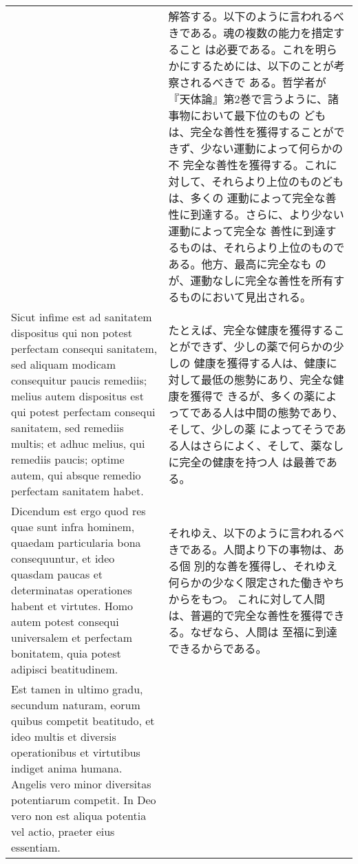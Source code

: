 \documentclass[paper=a4paper,fontsize=10pt,jafontsize=9pt,titlepage]{jlreq}
\begin{document}
\begin{longtable}{p{21em}p{21em}}
 &

解答する。以下のように言われるべきである。魂の複数の能力を措定すること
は必要である。これを明らかにするためには、以下のことが考察されるべきで
ある。哲学者が『天体論』第2巻で言うように、諸事物において最下位のもの
どもは、完全な善性を獲得することができず、少ない運動によって何らかの不
完全な善性を獲得する。これに対して、それらより上位のものどもは、多くの
運動によって完全な善性に到達する。さらに、より少ない運動によって完全な
善性に到達するものは、それらより上位のものである。他方、最高に完全なも
のが、運動なしに完全な善性を所有するものにおいて見出される。

\\


 Sicut infime est ad sanitatem dispositus qui non potest
 perfectam consequi sanitatem, sed aliquam modicam consequitur paucis
 remediis; melius autem dispositus est qui potest perfectam consequi
 sanitatem, sed remediis multis; et adhuc melius, qui remediis paucis;
 optime autem, qui absque remedio perfectam sanitatem habet.
 
 &

 たとえば、完全な健康を獲得することができず、少しの薬で何らかの少しの
 健康を獲得する人は、健康に対して最低の態勢にあり、完全な健康を獲得で
 きるが、多くの薬によってである人は中間の態勢であり、そして、少しの薬
 によってそうである人はさらによく、そして、薬なしに完全の健康を持つ人
 は最善である。


\\

Dicendum est ergo quod res quae sunt infra hominem, quaedam
 particularia bona consequuntur, et ideo quasdam paucas et
 determinatas operationes habent et virtutes. Homo autem potest
 consequi universalem et perfectam bonitatem, quia potest adipisci
 beatitudinem.
 
 &

 それゆえ、以下のように言われるべきである。人間より下の事物は、ある個
 別的な善を獲得し、それゆえ何らかの少なく限定された働きやちからをもつ。
 これに対して人間は、普遍的で完全な善性を獲得できる。なぜなら、人間は
 至福に到達できるからである。


\\

 Est tamen in ultimo gradu, secundum naturam, eorum quibus competit
 beatitudo, et ideo multis et diversis operationibus et virtutibus
 indiget anima humana. Angelis vero minor diversitas potentiarum
 competit. In Deo vero non est aliqua potentia vel actio, praeter eius
 essentiam.
 

\end{longtable}
\end{document}
